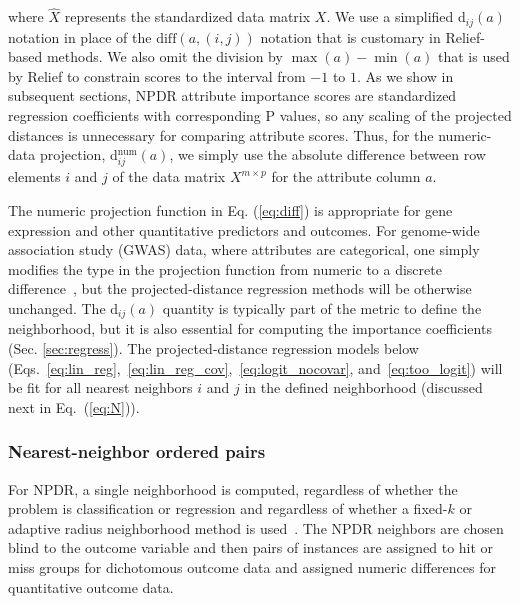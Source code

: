 \documentclass{bioinfo}
\begin{document}
where $\hat{X}$ represents the standardized data matrix $X$.
We use a simplified d$_{ij}(a)$ notation in place of the $\text{diff}(a,(i,j))$ notation that is customary in Relief-based methods.
We also omit the division by $\max(a)-\min(a)$ that is used by Relief to constrain scores to the interval from $-1$ to $1$.
As we show in subsequent sections, NPDR attribute importance scores are standardized regression coefficients with corresponding P values, so any scaling of the projected distances is unnecessary for comparing attribute scores.
Thus, for the numeric-data projection, d$^{\text{num}}_{ij}(a)$, we simply use the absolute difference between row elements $i$ and $j$ of the data matrix $X^{m \times p}$ for the attribute column $a$.

The numeric projection function in Eq. (\ref{eq:diff}) is appropriate for gene expression and other quantitative predictors and outcomes.
For genome-wide association study (GWAS) data, where attributes are categorical, one simply modifies the type in the projection function from numeric to a discrete difference~\citep{titv}, but the projected-distance regression methods will be otherwise unchanged.
The $\text{d}_{ij}(a)$ quantity is typically part of the metric to define the neighborhood, but it is also essential for computing the importance coefficients (Sec. \ref{sec:regress}).
The projected-distance regression models below (Eqs.~\ref{eq:lin_reg},~\ref{eq:lin_reg_cov},~\ref{eq:logit_nocovar}, and~\ref{eq:too_logit}) will be fit for all nearest neighbors $i$ and $j$ in the defined neighborhood (discussed next in Eq.~(\ref{eq:N})).

\subsubsection{Nearest-neighbor ordered pairs}
For NPDR, a single neighborhood is computed, regardless of whether the problem is classification or regression and regardless of whether a fixed-$k$ or adaptive radius neighborhood method is used~\citep{greene09,urbanowicz17,mckinney13}.
The NPDR neighbors are chosen blind to the outcome variable and then pairs of instances are assigned to hit or miss groups for dichotomous outcome data and assigned numeric differences for quantitative outcome data.
\end{document}
